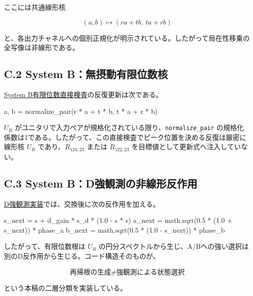 \documentclass[
  a4paper,
  10pt]{article}
\newenvironment{Shaded}{}{}
\newcommand{\FloatTok}[1]{\textcolor[rgb]{0.25,0.63,0.44}{#1}}
\newcommand{\NormalTok}[1]{#1}
\newcommand{\OperatorTok}[1]{\textcolor[rgb]{0.40,0.40,0.40}{#1}}
\begin{document}
ここには共通線形核

\[
(a,b)\mapsto(ra+tb,\ ta+rb)
\]

と、各出力チャネルへの個別正規化が明示されている。したがって局在性移乗の全写像は非線形である。

\subsection{C.2 System
B：無摂動有限位数核}\label{c2-system-bux7121ux6442ux52d5ux6709ux9650ux4f4dux6570ux6838}

\href{../20260715/run_minimal_system_B_gray_direct_check_v5.py}{System
B有限位数直接検査}の反復更新は次である。

\begin{Shaded}
\begin{Highlighting}[]
\NormalTok{a, b }\OperatorTok{=}\NormalTok{ normalize\_pair(r }\OperatorTok{*}\NormalTok{ a }\OperatorTok{+}\NormalTok{ t }\OperatorTok{*}\NormalTok{ b, t }\OperatorTok{*}\NormalTok{ a }\OperatorTok{+}\NormalTok{ r }\OperatorTok{*}\NormalTok{ b)}
\end{Highlighting}
\end{Shaded}

\(U_R\)
がユニタリで入力ペアが規格化されている限り、\texttt{normalize\_pair}
の規格化係数は1である。したがって、この直接検査でピーク位置を決める反復は厳密に線形核
\(U_R\) であり、\(R_{124,23}\) または \(R_{122,23}\)
を目標値として更新式へ注入していない。

\subsection{C.3 System
B：D強観測の非線形反作用}\label{c3-system-bdux5f37ux89b3ux6e2cux306eux975eux7ddaux5f62ux53cdux4f5cux7528}

\href{../20260714/run_gray_cat_d_observation_response_preliminary_v1.py}{D強観測実装}では、交換後に次の反作用を加える。

\begin{Shaded}
\begin{Highlighting}[]
\NormalTok{s\_next }\OperatorTok{=}\NormalTok{ s }\OperatorTok{+}\NormalTok{ d\_gain }\OperatorTok{*}\NormalTok{ s\_d }\OperatorTok{*}\NormalTok{ (}\FloatTok{1.0} \OperatorTok{{-}}\NormalTok{ s }\OperatorTok{*}\NormalTok{ s)}
\NormalTok{a\_next }\OperatorTok{=}\NormalTok{ math.sqrt(}\FloatTok{0.5} \OperatorTok{*}\NormalTok{ (}\FloatTok{1.0} \OperatorTok{+}\NormalTok{ s\_next)) }\OperatorTok{*}\NormalTok{ phase\_a}
\NormalTok{b\_next }\OperatorTok{=}\NormalTok{ math.sqrt(}\FloatTok{0.5} \OperatorTok{*}\NormalTok{ (}\FloatTok{1.0} \OperatorTok{{-}}\NormalTok{ s\_next)) }\OperatorTok{*}\NormalTok{ phase\_b}
\end{Highlighting}
\end{Shaded}

したがって、有限位数根は \(U_R\)
の円分スペクトルから生じ、A/Bへの強い選択は別のD反作用から生じる。コード構造そのものが、

\[
\boxed{
\text{再帰根の生成}
\ne
\text{強観測による状態選択}
}
\]

という本稿の二層分類を実装している。
\end{document}
